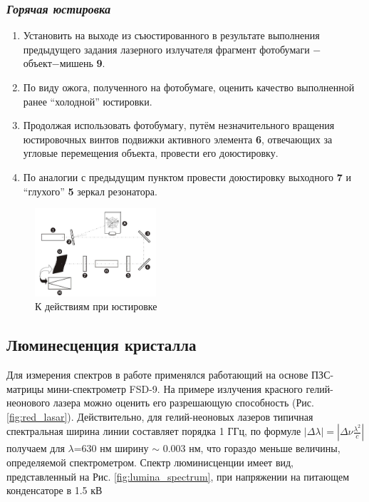 \documentclass[twocolumn]{article}
\begin{document}
\subsubsection{\emph{Горячая юстировка}}
\begin{enumerate}
\def\labelenumi{\arabic{enumi}.}
\itemsep1pt\parskip0pt
\item
  Установить на выходе из съюстированного в результате выполнения
  предыдущего задания лазерного излучателя фрагмент фотобумаги −
  объект−мишень \textbf{9}.
\item
  По виду ожога, полученного на фотобумаге, оценить качество выполненной
  ранее ``холодной'' юстировки.
\item
  Продолжая использовать фотобумагу, путём незначительного вращения
  юстировочных винтов подвижки активного элемента \textbf{6}, отвечающих
  за угловые перемещения объекта, провести его доюстировку.
\item
  По аналогии с предыдущим пунктом провести доюстировку выходного
  \textbf{7} и ``глухого'' \textbf{5} зеркал резонатора.
\end{enumerate}

 
         
    \begin{figure}
    \centering
    \includegraphics[width=0.4\textwidth]{LEMPH Report_files/LEMPH Report_14_0.png}
    \caption{К действиям при юстировке \label{fig:justify}}
    \end{figure}
               
        

    
\subsection{Люминесценция кристалла}

Для измерения спектров в работе применялся работающий на основе ПЗС-матрицы мини-спектрометр FSD-9. На примере излучения красного гелий-неонового лазера можно оценить его разрешающую способность (Рис. \ref{fig:red_lasar}). Действительно, для гелий-неоновых лазеров типичная спектральная ширина линии составляет порядка 1 ГГц, по формуле $|\Delta \lambda| = |\Delta \nu \frac{\lambda^2}{c}|$ получаем для $\lambda$=630 нм ширину $\sim$ 0.003 нм, что гораздо меньше величины, определяемой спектрометром.
Спектр люминисценции имеет вид, представленный на Рис. \ref{fig:lumina_spectrum}, при напряжении на питающем конденсаторе в 1.5 кВ
\end{document}
